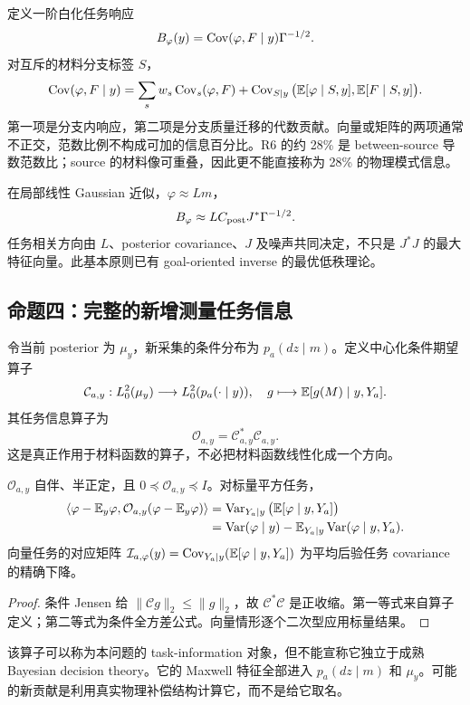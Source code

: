 定义一阶白化任务响应
\[
B_\varphi(y)=\operatorname{Cov}(\varphi,F\mid y)\Gamma^{-1/2}.
\]
对互斥的材料分支标签 $S$，
\[
\operatorname{Cov}(\varphi,F\mid y)
=
\sum_s w_s\operatorname{Cov}_s(\varphi,F)
+
\operatorname{Cov}_{S\mid y}\big(\mathbb E[\varphi\mid S,y],\mathbb E[F\mid S,y]\big).
\]
第一项是分支内响应，第二项是分支质量迁移的代数贡献。向量或矩阵的两项通常不正交，范数比例不构成可加的信息百分比。R6 的约 28\% 是 between-source 导数范数比；source 的材料像可重叠，因此更不能直接称为 28\% 的物理模式信息。

在局部线性 Gaussian 近似，$\varphi\approx Lm$，
\[
B_\varphi\approx L C_{\rm post}J^*\Gamma^{-1/2}.
\]
任务相关方向由 $L$、posterior covariance、$J$ 及噪声共同决定，不只是 $J^*J$ 的最大特征向量。此基本原则已有 goal-oriented inverse 的最优低秩理论。

\subsection{命题四：完整的新增测量任务信息}
令当前 posterior 为 $\mu_y$，新采集的条件分布为 $p_a(dz\mid m)$。定义中心化条件期望算子
\[
\mathcal C_{a,y}:L^2_0(\mu_y)\longrightarrow L^2_0(p_a(\cdot\mid y)),
\quad
g\longmapsto \mathbb E[g(M)\mid y,Y_a].
\]
其任务信息算子为
\[
\mathcal O_{a,y}=\mathcal C_{a,y}^*\mathcal C_{a,y}.
\]
这是真正作用于材料函数的算子，不必把材料函数线性化成一个方向。

\begin{theorem}
\label{thm:task-information}
$\mathcal O_{a,y}$ 自伴、半正定，且 $0\preceq\mathcal O_{a,y}\preceq I$。对标量平方任务，
\begin{align}
\langle\varphi-\mathbb E_y\varphi,\mathcal O_{a,y}(\varphi-\mathbb E_y\varphi)\rangle
&=\operatorname{Var}_{Y_a\mid y}\big(\mathbb E[\varphi\mid y,Y_a]\big)\\
&=\operatorname{Var}(\varphi\mid y)-\mathbb E_{Y_a\mid y}\operatorname{Var}(\varphi\mid y,Y_a).
\label{eq:task-bayes-reduction}
\end{align}
向量任务的对应矩阵
$\mathcal I_{a,\varphi}(y)=\operatorname{Cov}_{Y_a\mid y}(\mathbb E[\varphi\mid y,Y_a])$
为平均后验任务 covariance 的精确下降。
\end{theorem}
\begin{proof}
条件 Jensen 给 $\|\mathcal C g\|_2\le\|g\|_2$，故 $\mathcal C^*\mathcal C$ 是正收缩。第一等式来自算子定义；第二等式为条件全方差公式。向量情形逐个二次型应用标量结果。
\end{proof}

该算子可以称为本问题的 task-information 对象，但不能宣称它独立于成熟 Bayesian decision theory。它的 Maxwell 特征全部进入 $p_a(dz\mid m)$ 和 $\mu_y$。可能的新贡献是利用真实物理补偿结构计算它，而不是给它取名。

